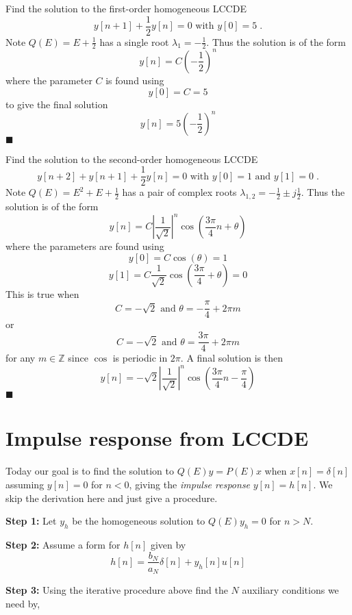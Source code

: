 \begin{example}
  Find the solution to the first-order homogeneous LCCDE
  \[
  y[n+1] + \frac{1}{2}y[n] = 0 \mbox{ with } y[0] = 5 \; .
  \]
  Note $Q(E) = E + \frac{1}{2}$ has a single root $\lambda_1 = -\frac{1}{2}$. Thus the solution is of the form
  \[
  y[n] = C\left( -\frac{1}{2}\right)^n
  \]
  where the parameter $C$ is found using
  \[
  y[0] = C = 5
  \]
  to give the final solution
  \[
  y[n] = 5\left( -\frac{1}{2}\right)^n
  \]
  $\blacksquare$  
\end{example}

\begin{example}
  Find the solution to the second-order homogeneous LCCDE
  \[
  y[n+2] + y[n+1] + \frac{1}{2}y[n] = 0 \mbox{ with } y[0] = 1 \mbox{ and } y[1] = 0\; .
  \]
  Note $Q(E) = E^2 + E + \frac{1}{2}$ has a pair of complex roots $\lambda_{1,2} = -\frac{1}{2} \pm j\frac{1}{2}$. Thus the solution is of the form
  \[
  y[n] = C \left|\frac{1}{\sqrt{2}}\right|^n\cos\left(\frac{3\pi}{4} n + \theta\right)
  \]
  where the parameters are found using
  \[
  y[0] = C\cos\left(\theta\right) = 1
  \]
  \[
  y[1] = C\frac{1}{\sqrt{2}}\cos\left(\frac{3\pi}{4} + \theta\right) = 0
  \]
  This is true when
  \[
  C = -\sqrt{2} \mbox{ and } \theta = -\frac{\pi}{4} + 2\pi m
  \]
  or
  \[      
  C = -\sqrt{2} \mbox{ and } \theta = \frac{3\pi}{4} + 2\pi m
  \]
  for any $m\in \mathbb{Z}$ since $\cos$ is periodic in $2\pi$. A final solution is then
  \[
  y[n] = -\sqrt{2} \left|\frac{1}{\sqrt{2}}\right|^n\cos\left(\frac{3\pi}{4} n - \frac{\pi}{4}\right)
  \]
  $\blacksquare$
\end{example}

\section{Impulse response from LCCDE}

Today our goal is to find the solution to $Q(E)y=P(E)x$ when $x[n] = \delta[n]$ assuming $y[n] = 0$ for $n < 0$, giving the \emph{impulse response} $y[n] = h[n]$. We skip the derivation here and just give a procedure.

\textbf{Step 1:} Let $y_h$ be the homogeneous solution to $Q(E)y_h=0$ for $n > N$.

\textbf{Step 2:} Assume a form for $h[n]$ given by
\[
h[n] = \frac{b_N}{a_N}\delta[n] + y_h[n]u[n]
\]

\textbf{Step 3:} Using the iterative procedure above find the $N$ auxiliary conditions we need by,


